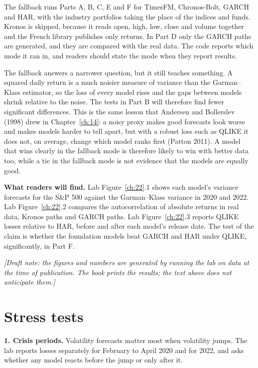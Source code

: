 The fallback runs Parts A, B, C, E and F for TimesFM, Chronos-Bolt, GARCH and HAR, with the industry portfolios taking the place of the indices and funds. Kronos is skipped, because it reads open, high, low, close and volume together and the French library publishes only returns. In Part D only the GARCH paths are generated, and they are compared with the real data. The code reports which mode it ran in, and readers should state the mode when they report results.

The fallback answers a narrower question, but it still teaches something. A squared daily return is a much noisier measure of variance than the Garman--Klass estimator, so the loss of every model rises and the gaps between models shrink relative to the noise. The tests in Part B will therefore find fewer significant differences. This is the same lesson that Andersen and Bollerslev (1998) drew in Chapter~\ref{ch:14}: a noisy proxy makes good forecasts look worse and makes models harder to tell apart, but with a robust loss such as QLIKE it does not, on average, change which model ranks first (Patton 2011). A model that wins clearly in the fallback mode is therefore likely to win with better data too, while a tie in the fallback mode is not evidence that the models are equally good.

\textbf{What readers will find.} Lab Figure~\ref{ch:22}.1 shows each model's variance forecasts for the S\&P 500 against the Garman--Klass variance in 2020 and 2022. Lab Figure~\ref{ch:22}.2 compares the autocorrelation of absolute returns in real data, Kronos paths and GARCH paths. Lab Figure~\ref{ch:22}.3 reports QLIKE losses relative to HAR, before and after each model's release date. The test of the claim is whether the foundation models beat GARCH and HAR under QLIKE, significantly, in Part F.

\emph{[Draft note: the figures and numbers are generated by running the lab on data at the time of publication. The book prints the results; the text above does not anticipate them.]}

\section{Stress tests}
\label{sec:22-stress}

\textbf{1. Crisis periods.} Volatility forecasts matter most when volatility jumps. The lab reports losses separately for February to April 2020 and for 2022, and asks whether any model reacts before the jump or only after it.

